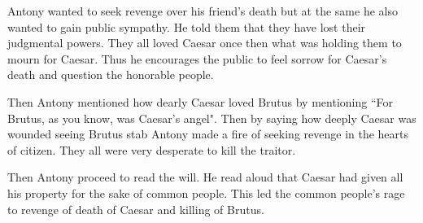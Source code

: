 \documentclass{article}
\begin{document}
	Antony wanted to seek revenge over his friend's death but at the same he also wanted to gain public sympathy. He told them that they have lost their judgmental powers. They all loved Caesar once then what was holding them to mourn for Caesar. Thus he encourages the public  to feel sorrow for Caesar's death and question the honorable people.
	
	Then Antony mentioned how dearly Caesar loved Brutus by mentioning ``For Brutus, as you know, was Caesar’s angel". Then by saying how deeply Caesar was wounded seeing Brutus stab Antony made a fire of seeking revenge in the hearts of citizen. They all were very desperate to kill the traitor.
	
	Then Antony proceed to read the will. He read aloud that Caesar had given all his property for the sake of common people. This led the common people's rage to revenge of death of Caesar and killing of Brutus.
	
	
	
\end{document}
